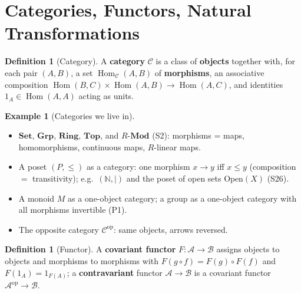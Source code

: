 \documentclass[11pt,a4paper]{article}
\theoremstyle{definition}
\newtheorem{definition}[theorem]{Definition}
\newtheorem{example}[theorem]{Example}
\newcommand{\N}{\mathbb{N}}
\newcommand{\Hom}{\operatorname{Hom}}
\newcommand{\Set}{\mathbf{Set}}
\newcommand{\Grp}{\mathbf{Grp}}
\newcommand{\Ring}{\mathbf{Ring}}
\newcommand{\Top}{\mathbf{Top}}
\begin{document}
\tableofcontents
\newpage

\section{Categories, Functors, Natural Transformations}

\begin{definition}[Category]
A \textbf{category} $\mathcal C$ is a class of \textbf{objects} together with, for each pair
$(A,B)$, a set $\Hom_{\mathcal C}(A,B)$ of \textbf{morphisms}, an associative composition
$\Hom(B,C)\times\Hom(A,B)\to\Hom(A,C)$, and identities $1_A\in\Hom(A,A)$ acting as units.
\end{definition}

\begin{example}[Categories we live in]\label{ex:cats}
\begin{itemize}
  \item $\Set$, $\Grp$, $\Ring$, $\Top$, and $R\text{-}\mathbf{Mod}$ (S2): morphisms = maps,
    homomorphisms, continuous maps, $R$-linear maps.
  \item A poset $(P,\le)$ as a category: one morphism $x\to y$ iff $x\le y$ (composition $=$
    transitivity); e.g.\ $(\N,\mid)$ and the poset of open sets $\mathrm{Open}(X)$ (S26).
  \item A monoid $M$ as a one-object category; a group as a one-object category with all morphisms
    invertible (P1).
  \item The opposite category $\mathcal C^{\mathrm{op}}$: same objects, arrows reversed.
\end{itemize}
\end{example}

\begin{definition}[Functor]
A \textbf{covariant functor} $F:\mathcal A\to\mathcal B$ assigns objects to objects and morphisms to
morphisms with $F(g\circ f)=F(g)\circ F(f)$ and $F(1_A)=1_{F(A)}$; a \textbf{contravariant} functor
$\mathcal A\to\mathcal B$ is a covariant functor $\mathcal A^{\mathrm{op}}\to\mathcal B$.
\end{definition}
\end{document}
